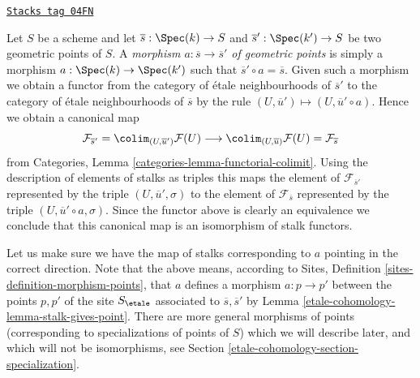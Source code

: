 \begin{remark}
\label{etale-cohomology-remark-map-stalks}
\href{https://stacks.math.columbia.edu/tag/04FN}{\texttt{Stacks tag 04FN}}

Let $S$ be a scheme and let $\overline{s} : \Spec(k) \to S$
and $\overline{s}' : \Spec(k') \to S$ be two geometric points of
$S$. A {\it morphism $a : \overline{s} \to \overline{s}'$ of geometric points}
is simply a morphism $a : \Spec(k) \to \Spec(k')$ such that
$\overline{s}' \circ a = \overline{s}$. Given such a morphism we obtain
a functor from the category of \'etale neighbourhoods of $\overline{s}'$
to the category of \'etale neighbourhoods of $\overline{s}$ by the rule
$(U, \overline{u}') \mapsto (U, \overline{u}' \circ a)$. Hence we obtain
a canonical map
$$
\mathcal{F}_{\overline{s}'}
=
\colim_{(U, \overline{u}')} \mathcal{F}(U)
\longrightarrow
\colim_{(U, \overline{u})} \mathcal{F}(U)
=
\mathcal{F}_{\overline{s}}
$$
from Categories, Lemma \ref{categories-lemma-functorial-colimit}. Using the
description of elements of stalks as triples this maps the element of
$\mathcal{F}_{\overline{s}'}$ represented by the triple
$(U, \overline{u}', \sigma)$ to the element of $\mathcal{F}_{\overline{s}}$
represented by the triple $(U, \overline{u}' \circ a, \sigma)$.
Since the functor above is clearly an equivalence we conclude that this
canonical map is an isomorphism of stalk functors.

\medskip\noindent
Let us make sure we have the map of stalks corresponding to $a$ pointing
in the correct direction. Note that the above means, according to
Sites, Definition \ref{sites-definition-morphism-points},
that $a$ defines a morphism $a : p \to p'$ between the points $p, p'$ of
the site $S_\etale$ associated to $\overline{s}, \overline{s}'$ by
Lemma \ref{etale-cohomology-lemma-stalk-gives-point}. There are more general morphisms of
points (corresponding to specializations of points of $S$) which we will
describe later, and which will not be isomorphisms, see Section
\ref{etale-cohomology-section-specialization}.
\end{remark}

